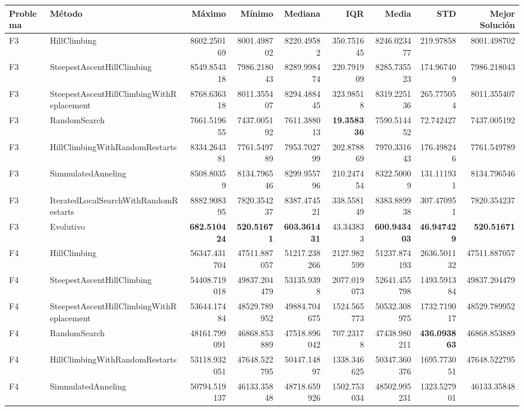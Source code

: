 \begin{tabular}{llrrrrrrr}
\toprule
Problema & Método & Máximo & Mínimo & Mediana & IQR & Media & STD & Mejor Solución \\ 
\midrule
F3 & HillClimbing & 8602.250169 & 8001.498702 & 8220.49582 & 350.751645 & 8246.023477 & 219.97858 & 8001.498702 \\ 
F3 & SteepestAscentHillClimbing & 8549.854318 & 7986.218043 & 8289.998474 & 220.791909 & 8285.735523 & 174.967409 & 7986.218043 \\ 
F3 & SteepestAscentHillClimbingWithReplacement & 8768.636318 & 8011.355407 & 8294.488445 & 323.98518 & 8319.225136 & 265.775054 & 8011.355407 \\ 
F3 & RandomSearch & 7661.519655 & 7437.005192 & 7611.388013 & \textbf{19.358336} & 7590.514452 & 72.742427 & 7437.005192 \\ 
F3 & HillClimbingWithRandomRestarts & 8334.264381 & 7761.549789 & 7953.702799 & 202.878869 & 7970.331643 & 176.498246 & 7761.549789 \\ 
F3 & SimmulatedAnneling & 8508.80359 & 8134.796546 & 8299.955796 & 210.247454 & 8322.50009 & 131.111931 & 8134.796546 \\ 
F3 & IteratedLocalSearchWithRandomRestarts & 8882.908395 & 7820.354237 & 8387.474521 & 338.558149 & 8383.889938 & 307.470951 & 7820.354237 \\ 
F3 & Evolutivo & \textbf{682.510424} & \textbf{520.51671} & \textbf{603.361431} & 43.343833 & \textbf{600.943403} & \textbf{46.947429} & \textbf{520.51671} \\ 
\midrule
F4 & HillClimbing & 56347.431704 & 47511.887057 & 51217.238266 & 2127.982599 & 51237.874193 & 2636.501132 & 47511.887057 \\ 
F4 & SteepestAscentHillClimbing & 54408.719018 & 49837.204479 & 53135.9398 & 2077.019073 & 52641.455798 & 1493.591384 & 49837.204479 \\ 
F4 & SteepestAscentHillClimbingWithReplacement & 53644.17484 & 48529.789952 & 49884.704675 & 1524.565773 & 50532.308975 & 1732.719017 & 48529.789952 \\ 
F4 & RandomSearch & 48161.799091 & 46868.853889 & 47518.896042 & 707.23178 & 47438.980211 & \textbf{436.093863} & 46868.853889 \\ 
F4 & HillClimbingWithRandomRestarts & 53118.932051 & 47648.522795 & 50447.14897 & 1338.346625 & 50347.360376 & 1695.773051 & 47648.522795 \\ 
F4 & SimmulatedAnneling & 50794.519137 & 46133.35848 & 48718.659926 & 1502.753034 & 48502.995231 & 1323.527901 & 46133.35848 \\ 

\end{tabular}
